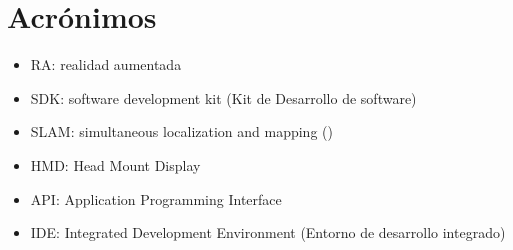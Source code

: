 \newpage
\chapter*{Acrónimos}

\begin{itemize}
\item RA: realidad aumentada
\item SDK: software development kit (Kit de Desarrollo de software) 
\item SLAM: simultaneous localization and mapping () 
\item HMD: Head Mount Display 
\item API: Application Programming Interface 
\item IDE: Integrated Development Environment (Entorno de desarrollo integrado)
\end{itemize}

\noindent
